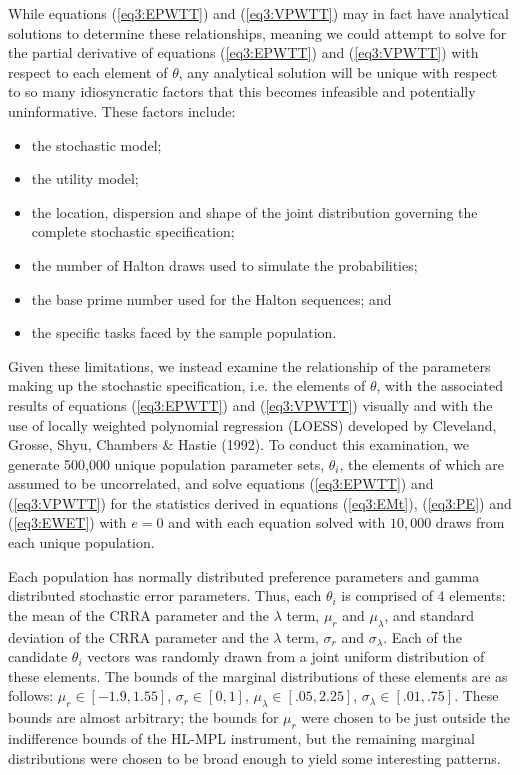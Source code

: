 \documentclass[../main.tex]{subfiles}
\begin{document}
While equations (\ref{eq3:EPWTT}) and (\ref{eq3:VPWTT}) may in fact have analytical solutions to determine these relationships, meaning we could attempt to solve for the partial derivative of equations (\ref{eq3:EPWTT}) and (\ref{eq3:VPWTT}) with respect to each element of $\theta$, any analytical solution will be unique with respect to so many idiosyncratic factors that this becomes infeasible and potentially uninformative.
These factors include:
\begin{itemize}
 \setlength\itemsep{-.25em}
	\item the stochastic model;
	\item the utility model;
	\item the location, dispersion and shape of the joint distribution governing the complete stochastic specification;
	\item the number of Halton draws used to simulate the probabilities;
	\item the base prime number used for the Halton sequences; and
	\item the specific tasks faced by the sample population.
\end{itemize}

\noindent Given these limitations, we instead examine the relationship of the parameters making up the stochastic specification, i.e. the elements of $\theta$, with the associated results of equations (\ref{eq3:EPWTT}) and (\ref{eq3:VPWTT}) visually and with the use of locally weighted polynomial regression (LOESS) developed by Cleveland, Grosse, Shyu, Chambers \& Hastie (1992).
To conduct this examination, we generate 500,000 unique population parameter sets, $\theta_i$, the elements of which are assumed to be uncorrelated, and solve equations (\ref{eq3:EPWTT}) and (\ref{eq3:VPWTT}) for the statistics derived in equations (\ref{eq3:EMt}), (\ref{eq3:PE}) and (\ref{eq3:EWET}) with $e=0$ and with each equation solved with $10,000$ draws from each unique population.

Each population has normally distributed preference parameters and gamma distributed stochastic error parameters.
Thus, each $\theta_i$ is comprised of 4 elements: the mean of the CRRA parameter and the $\lambda$ term, $\mu_r$ and $\mu_\lambda$, and standard deviation of the CRRA parameter and the $\lambda$ term, $\sigma_r$ and $\sigma_\lambda$. Each of the candidate $\theta_i$ vectors was randomly drawn from a joint uniform distribution of these elements.
The bounds of the marginal distributions of these elements are as follows: $\mu_r \in [-1.9 , 1.55 ]$, $\sigma_r \in [0 , 1]$, $\mu_\lambda \in [.05 , 2.25]$, $\sigma_\lambda \in [.01 , .75]$.
These bounds are almost arbitrary; the bounds for $\mu_r$ were chosen to be just outside the indifference bounds of the HL-MPL instrument, but the remaining marginal distributions were chosen to be broad enough to yield some interesting patterns.
\end{document}

